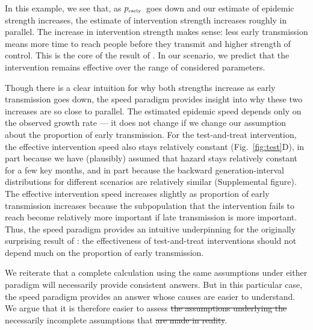 \documentclass[12pt]{article}
\newcommand{\tsub}[2]{#1_{{\textrm{\tiny #2}}}}
\newcommand{\pEarly}{\ensuremath{\tsub{p}{early}}}
\newcommand{\figref}[1]{Fig.~\ref{fig:#1}}
\providecommand{\DIFaddtex}[1]{{\protect\color{blue}\uwave{#1}}} %
\providecommand{\DIFdeltex}[1]{{\protect\color{red}\sout{#1}}}                      %
\providecommand{\DIFaddbegin}{} %
\providecommand{\DIFaddend}{} %
\providecommand{\DIFdelbegin}{} %
\providecommand{\DIFdelend}{} %
\providecommand{\DIFadd}[1]{\texorpdfstring{\DIFaddtex{#1}}{#1}} %
\providecommand{\DIFdel}[1]{\texorpdfstring{\DIFdeltex{#1}}{}} %
\newcommand{\DIFscaledelfig}{0.5}
\newlength{\DIFdelgraphicswidth} %
\newlength{\DIFdelgraphicsheight} %
\newcommand{\DIFaddincludegraphics}[2][]{{\color{blue}\fbox{\DIFOincludegraphics[#1]{#2}}}} %
\newcommand{\DIFdelincludegraphics}[2][]{%
\sbox{\DIFdelgraphicsbox}{\DIFOincludegraphics[#1]{#2}}%
\settoboxwidth{\DIFdelgraphicswidth}{\DIFdelgraphicsbox} %
\settoboxtotalheight{\DIFdelgraphicsheight}{\DIFdelgraphicsbox} %
\scalebox{\DIFscaledelfig}{%
\parbox[b]{\DIFdelgraphicswidth}{\usebox{\DIFdelgraphicsbox}\\[-\baselineskip] \rule{\DIFdelgraphicswidth}{0em}}\llap{\resizebox{\DIFdelgraphicswidth}{\DIFdelgraphicsheight}{%
\setlength{\unitlength}{\DIFdelgraphicswidth}%
\begin{picture}(1,1)%
\thicklines\linethickness{2pt} %
{\color[rgb]{1,0,0}\put(0,0){\framebox(1,1){}}}%
{\color[rgb]{1,0,0}\put(0,0){\line( 1,1){1}}}%
{\color[rgb]{1,0,0}\put(0,1){\line(1,-1){1}}}%
\end{picture}%
}\hspace*{3pt}}} %
} %
\DeclareRobustCommand{\DIFaddbegin}{\DIFOaddbegin \let\includegraphics\DIFaddincludegraphics} %
\DeclareRobustCommand{\DIFaddend}{\DIFOaddend \let\includegraphics\DIFOincludegraphics} %
\DeclareRobustCommand{\DIFdelbegin}{\DIFOdelbegin \let\includegraphics\DIFdelincludegraphics} %
\DeclareRobustCommand{\DIFdelend}{\DIFOaddend \let\includegraphics\DIFOincludegraphics} %
\begin{document}
In this example, we see that, as \pEarly\ goes down and our estimate of epidemic strength increases, the estimate of intervention strength increases roughly in parallel. The increase in intervention strength makes sense: less early transmission means more time to reach people before they transmit and higher strength of control. This is the core of the result of \cite{eaton2014proportion}. 
In our scenario, we predict that the intervention remains effective over the range of considered parameters.

Though there is a clear intuition for why both strengths increase as early transmission goes down, the speed paradigm provides insight into why these two increases are so close to parallel.
The estimated epidemic speed depends only on the observed growth rate --- it does not change if we change our assumption about the proportion of early transmission.
For the test-and-treat intervention, the effective intervention speed also stays relatively constant (\figref{test}D), in part because we have (plausibly) assumed that hazard stays relatively constant for a few key months, and in part because the backward generation-interval distributions for different scenarios are relatively similar (Supplemental figure).
The effective intervention speed increases slightly as proportion of early transmission increases because the subpopulation that the intervention fails to reach become relatively more important if late transmission is more important.
Thus, the speed paradigm provides an intuitive underpinning for the originally surprising result of \cite{eaton2014proportion}: the effectiveness of test-and-treat interventions should not depend much on the proportion of early transmission.

We reiterate that a complete calculation using the same assumptions under either paradigm will necessarily provide consistent answers. But in this particular case, the speed paradigm provides an answer whose causes are easier to understand. We argue that it is therefore easier to assess \DIFdelbegin \DIFdel{the assumptions underlying the }\DIFdelend \DIFaddbegin \DIFadd{and investigate the }\DIFaddend necessarily incomplete assumptions that \DIFdelbegin \DIFdel{are made in reality}\DIFdelend \DIFaddbegin \DIFadd{underlie the conclusion}\DIFaddend .

\end{document}
